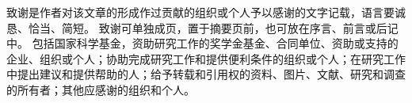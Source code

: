 \begin{acknowledgements}
    致谢是作者对该文章的形成作过贡献的组织或个人予以感谢的文字记载，语言要诚恳、恰当、简短。
    致谢可单独成页，置于摘要页前，也可放在序言、前言或后记中。
    包括国家科学基金，资助研究工作的奖学金基金、合同单位、资助或支持的企业、组织或个人；协助完成研究工作和提供便利条件的组织或个人；在研究工作中提出建议和提供帮助的人；给予转载和引用权的资料、图片、文献、研究和调查的所有者；其他应感谢的组织和个人。
\end{acknowledgements}

